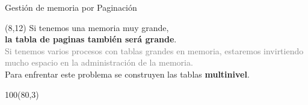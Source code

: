 \documentclass[aspectratio=169]{beamer}
\begin{document}
\begin{frame}[t]{Gestión de memoria por Paginación}
    \begin{textblock}{68}(8,12)
    Si tenemos una memoria muy grande,\\ \textbf{la tabla de paginas también será grande}.\\
    \medskip
    \textcolor{gray}{Si tenemos varios procesos con tablas grandes en memoria, estaremos invirtiendo mucho espacio en la administración de la memoria.\\}
    \medskip
    Para enfrentar este problema se construyen las tablas \textcolor{naranjauca}{\textbf{multinivel}}.\\
    \end{textblock}
    \begin{textblock}{100}(80,3)  \end{textblock}
\end{frame}
\end{document}
